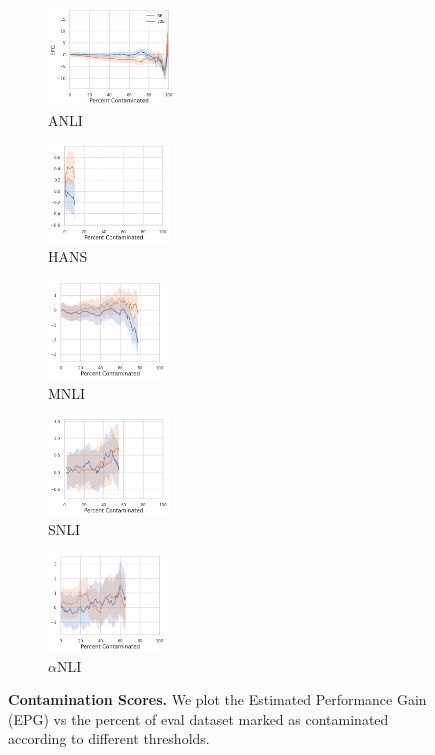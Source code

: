 \begin{figure}[t]
    \begin{subfigure}[b]{0.20\textwidth}
    \centering
    \includegraphics[height=2.6cm]{figures/contamination_anli}
    \caption{ANLI}
    \end{subfigure}
    \label{fig:cont_anli}
    \begin{subfigure}[b]{0.19\textwidth}
    \centering
    \includegraphics[height=2.6cm]{figures/contamination_hansnli}
    \caption{HANS}
    \label{fig:cont_hans}
    \end{subfigure}
    \begin{subfigure}[b]{0.19\textwidth}
    \centering
    \includegraphics[height=2.6cm]{figures/contamination_mnli_matched}
    \caption{MNLI}
    \label{fig:cont_mnli}
    \end{subfigure}
    \begin{subfigure}[b]{0.19\textwidth}
    \centering
    \includegraphics[height=2.6cm]{figures/contamination_snli}
    \caption{SNLI}
    \label{fig:cont_snli}
    \end{subfigure}
    \begin{subfigure}[b]{0.19\textwidth}
    \centering
    \includegraphics[height=2.6cm]{figures/contamination_abductivenli}
    \caption{$\alpha$NLI}
    \label{fig:cont_alphanli}
    \end{subfigure}
    \caption{\textbf{Contamination Scores.} We plot the Estimated Performance Gain (EPG) vs the percent of eval dataset marked as contaminated according to different thresholds.}\label{fig:contamination}
\end{figure}

